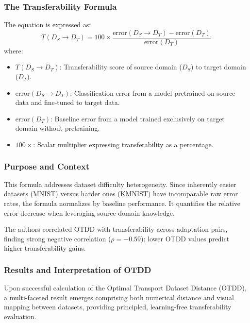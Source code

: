 \documentclass[11pt, a4paper]{article}
\theoremstyle{plain} %
\theoremstyle{definition} %
\begin{document}
			\subsubsection{The Transferability Formula}
			\label{sec:transferability_formula}
				The equation is expressed as:
				\begin{equation}
					\label{eq:transferability_formula}
					T(D_S \to D_T) = 100 \times \frac{\text{error}(D_S \to D_T) - \text{error}(D_T)}{\text{error}(D_T)}
				\end{equation}
				where:
				\begin{itemize}
					\item $T(D_S \to D_T)$: Transferability score of source domain ($D_S$) to target domain ($D_T$).
					\item $\text{error}(D_S \to D_T)$: Classification error from a model pretrained on source data and fine-tuned to target data.
					\item $\text{error}(D_T)$: Baseline error from a model trained exclusively on target domain without pretraining.
					\item $100 \times$: Scalar multiplier expressing transferability as a percentage.
				\end{itemize}

			\subsubsection{Purpose and Context}
			\label{sec:purpose_and_context}
				This formula addresses dataset difficulty heterogeneity. Since inherently easier datasets (MNIST) versus harder ones (KMNIST) have incomparable raw error rates, the formula normalizes by baseline performance. It quantifies the relative error decrease when leveraging source domain knowledge.

				The authors correlated OTDD with transferability across adaptation pairs, finding strong negative correlation ($\rho = -0.59$): lower OTDD values predict higher transferability gains.

			\subsubsection{Results and Interpretation of OTDD}
			\label{sec:results_and_interpretation}
				Upon successful calculation of the Optimal Transport Dataset Distance (OTDD), a multi-faceted result emerges comprising both numerical distance and visual mapping between datasets, providing principled, learning-free transferability evaluation.
\end{document}
